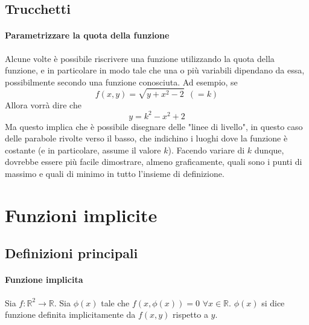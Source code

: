 \documentclass[a4paper,12pt]{article}
\begin{document}
\subsection{Trucchetti}
\paragraph{Parametrizzare la quota della funzione}
Alcune volte è possibile riscrivere una funzione utilizzando la quota della funzione, e in particolare in modo tale che una o più variabili dipendano da essa, possibilmente secondo una funzione conosciuta. Ad esempio, se
$$ f(x, y) = \sqrt{y + x^2 - 2}\ \ (= k)$$
Allora vorrà dire che
$$ y = k^2 - x^2 +2 $$
Ma questo implica che è possibile disegnare delle "linee di livello", in questo caso delle parabole rivolte verso il basso, che indichino i luoghi dove la funzione è costante (e in particolare, assume il valore $k$). Facendo variare di $k$ dunque, dovrebbe essere più facile dimostrare, almeno graficamente, quali sono i punti di massimo e quali di minimo in tutto l'insieme di definizione.
\section{Funzioni implicite}
\subsection{Definizioni principali}
\paragraph{Funzione implicita}
Sia $f: \mathbb{R}^2 \rightarrow \mathbb{R}$.
Sia $\phi(x)$ tale che $f(x, \phi(x)) = 0$ $\forall x \in \mathbb{R}$. $\phi(x)$ si dice funzione definita implicitamente da $f(x, y)$ rispetto a $y$.
\end{document}
